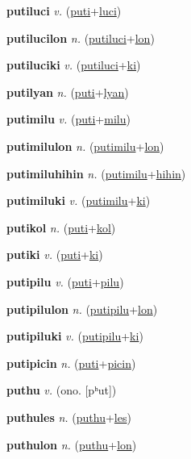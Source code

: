 \textbf{\hypertarget{putiluci}{putiluci}} \textit{v.} (\hyperlink{puti}{puti}+\allowbreak \hyperlink{luci}{luci})


\textbf{\hypertarget{putilucilon}{putilucilon}} \textit{n.} (\hyperlink{putiluci}{putiluci}+\allowbreak \hyperlink{lon}{lon})


\textbf{\hypertarget{putiluciki}{putiluciki}} \textit{v.} (\hyperlink{putiluci}{putiluci}+\allowbreak \hyperlink{ki}{ki})


\textbf{\hypertarget{putilyan}{putilyan}} \textit{n.} (\hyperlink{puti}{puti}+\allowbreak \hyperlink{lyan}{lyan})


\textbf{\hypertarget{putimilu}{putimilu}} \textit{v.} (\hyperlink{puti}{puti}+\allowbreak \hyperlink{milu}{milu})


\textbf{\hypertarget{putimilulon}{putimilulon}} \textit{n.} (\hyperlink{putimilu}{putimilu}+\allowbreak \hyperlink{lon}{lon})


\textbf{\hypertarget{putimiluhihin}{putimiluhihin}} \textit{n.} (\hyperlink{putimilu}{putimilu}+\allowbreak \hyperlink{hihin}{hihin})


\textbf{\hypertarget{putimiluki}{putimiluki}} \textit{v.} (\hyperlink{putimilu}{putimilu}+\allowbreak \hyperlink{ki}{ki})


\textbf{\hypertarget{putikol}{putikol}} \textit{n.} (\hyperlink{puti}{puti}+\allowbreak \hyperlink{kol}{kol})


\textbf{\hypertarget{putiki}{putiki}} \textit{v.} (\hyperlink{puti}{puti}+\allowbreak \hyperlink{ki}{ki})


\textbf{\hypertarget{putipilu}{putipilu}} \textit{v.} (\hyperlink{puti}{puti}+\allowbreak \hyperlink{pilu}{pilu})


\textbf{\hypertarget{putipilulon}{putipilulon}} \textit{n.} (\hyperlink{putipilu}{putipilu}+\allowbreak \hyperlink{lon}{lon})


\textbf{\hypertarget{putipiluki}{putipiluki}} \textit{v.} (\hyperlink{putipilu}{putipilu}+\allowbreak \hyperlink{ki}{ki})


\textbf{\hypertarget{putipicin}{putipicin}} \textit{n.} (\hyperlink{puti}{puti}+\allowbreak \hyperlink{picin}{picin})


\textbf{\hypertarget{puthu}{puthu}} \textit{v.} (ono. [pʰut])


\textbf{\hypertarget{puthules}{puthules}} \textit{n.} (\hyperlink{puthu}{puthu}+\allowbreak \hyperlink{les}{les})


\textbf{\hypertarget{puthulon}{puthulon}} \textit{n.} (\hyperlink{puthu}{puthu}+\allowbreak \hyperlink{lon}{lon})


